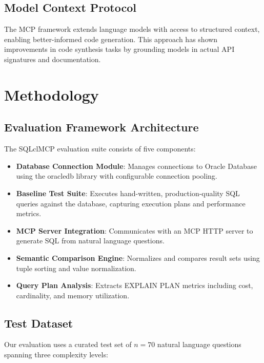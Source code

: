 \documentclass[11pt,a4paper]{article}
\begin{document}
\subsection{Model Context Protocol}
The MCP framework extends language models with access to structured context, enabling better-informed code generation. This approach has shown improvements in code synthesis tasks by grounding models in actual API signatures and documentation.

\section{Methodology}

\subsection{Evaluation Framework Architecture}

The SQLclMCP evaluation suite consists of five components:

\begin{itemize}
    \item \textbf{Database Connection Module}: Manages connections to Oracle Database using the oracledb library with configurable connection pooling.
    
    \item \textbf{Baseline Test Suite}: Executes hand-written, production-quality SQL queries against the database, capturing execution plans and performance metrics.
    
    \item \textbf{MCP Server Integration}: Communicates with an MCP HTTP server to generate SQL from natural language questions.
    
    \item \textbf{Semantic Comparison Engine}: Normalizes and compares result sets using tuple sorting and value normalization.
    
    \item \textbf{Query Plan Analysis}: Extracts EXPLAIN PLAN metrics including cost, cardinality, and memory utilization.
\end{itemize}

\subsection{Test Dataset}

Our evaluation uses a curated test set of $n=70$ natural language questions spanning three complexity levels:
\end{document}
